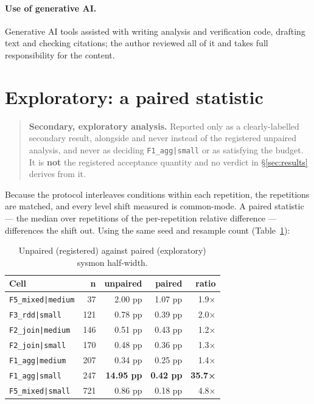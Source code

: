 \documentclass[sigconf,review,anonymous]{acmart}
\newcommand{\cell}[1]{\texttt{#1}}
\begin{document}
\paragraph{Use of generative AI.} Generative AI tools assisted with writing analysis
and verification code, drafting text and checking citations; the author reviewed all of it and takes
full responsibility for the content.


\label{body-end}


\appendix

\section{Exploratory: a paired statistic}\label{app:paired}

\begin{quote}
\textbf{Secondary, exploratory analysis.} Reported only as a clearly-labelled secondary result,
alongside and never instead of the registered unpaired analysis, and never as deciding
\cell{F1\_agg|small} or as satisfying the budget. It is \textbf{not} the registered acceptance
quantity and no verdict in \S\ref{sec:results} derives from it.
\end{quote}

Because the protocol interleaves conditions within each repetition, the repetitions are matched,
and every level shift measured is common-mode. A paired statistic --- the median over repetitions
of the per-repetition relative difference --- differences the shift out. Using the same seed and
resample count (Table~\ref{tab:paired}):

\begin{table}[h]
\caption{Unpaired (registered) against paired (exploratory) sysmon half-width.}\label{tab:paired}
\small
\begin{tabular}{lrrrr}
\toprule
Cell & n & unpaired & paired & ratio \\
\midrule
\cell{F5\_mixed|medium} & 37 & 2.00 pp & 1.07 pp & 1.9× \\
\cell{F3\_rdd|small} & 121 & 0.78 pp & 0.39 pp & 2.0× \\
\cell{F2\_join|medium} & 146 & 0.51 pp & 0.43 pp & 1.2× \\
\cell{F2\_join|small} & 170 & 0.48 pp & 0.36 pp & 1.3× \\
\cell{F1\_agg|medium} & 207 & 0.34 pp & 0.25 pp & 1.4× \\
\cell{F1\_agg|small} & 247 & \textbf{14.95 pp} & \textbf{0.42 pp} & \textbf{35.7×} \\
\cell{F5\_mixed|small} & 721 & 0.86 pp & 0.18 pp & 4.8× \\
\bottomrule
\end{tabular}
\end{table}
\end{document}
